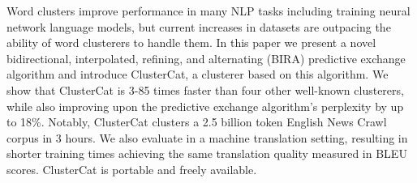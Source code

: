Word clusters improve performance in many NLP tasks including training neural network language models, but current increases in datasets are outpacing the ability of word clusterers to handle them. In this paper we present a novel bidirectional, interpolated, refining, and alternating (BIRA) predictive exchange algorithm and introduce ClusterCat, a clusterer based on this algorithm. We show that ClusterCat is 3-85 times faster than four other well-known clusterers, while also improving upon the predictive exchange algorithm's perplexity by up to 18\%. Notably, ClusterCat clusters a 2.5 billion token English News Crawl corpus in 3 hours. We also evaluate in a machine translation setting, resulting in shorter training times achieving the same translation quality measured in BLEU scores. ClusterCat is portable and freely available.
